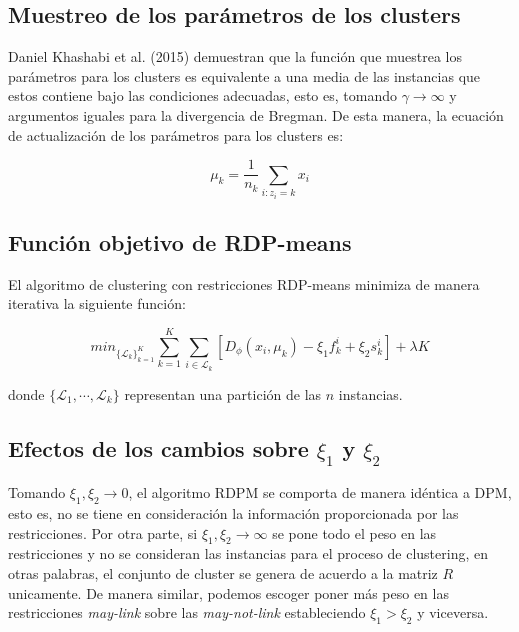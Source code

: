 \subsection{Muestreo de los parámetros de los clusters}

Daniel Khashabi et al. (2015) \cite{RDPM:2015} demuestran que la función que muestrea los parámetros para los clusters es equivalente a una media de las instancias que estos contiene bajo las condiciones adecuadas, esto es, tomando $\gamma \rightarrow \infty$ y argumentos iguales para la divergencia de Bregman. De esta manera, la ecuación de actualización de los parámetros para los clusters es:

\begin{equation}
\mu_k = \frac{1}{n_k} \sum_{i:z_i = k} x_i
\label{eqn61}
\end{equation}

\subsection{Función objetivo de RDP-means}

\begin{teorema}
	
	El algoritmo de clustering con restricciones RDP-means minimiza de manera iterativa la siguiente función:
	
	\begin{equation}
	min_{\{\mathcal{L}_k\}_{k=1}^K} \sum_{k=1}^{K} \sum_{i \in \mathcal{L}_k} \left[D_{\phi}(x_i, \mu_k) - \xi_1 f_{k}^i  + \xi_2 s_{k}^i\right] + \lambda K
	\label{eqn60}
	\end{equation}
	
	donde $\{\mathcal{L}_1, \cdots, \mathcal{L}_k\}$ representan una partición de las $n$ instancias.
	
\end{teorema}

\subsection{Efectos de los cambios sobre $\xi_1$ y $\xi_2$}

Tomando $\xi_1, \xi_2 \rightarrow 0$, el algoritmo \acs{RDPM} se comporta de manera idéntica a \acs{DPM}, esto es, no se tiene en consideración la información proporcionada por las restricciones. Por otra parte, si $\xi_1, \xi_2 \rightarrow \infty$ se pone todo el peso en las restricciones y no se consideran las instancias para el proceso de clustering, en otras palabras, el conjunto de cluster se genera de acuerdo a la matriz $R$ unicamente. De manera similar, podemos escoger poner más peso en las restricciones \textit{may-link} sobre las \textit{may-not-link} estableciendo $\xi_1 > \xi_2$ y viceversa.

